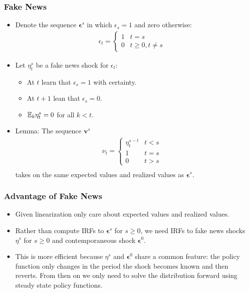 \documentclass[english,xcolor=svgnames]{beamer}
\begin{document}
\begin{frame}
    \frametitle{Fake News}
    \begin{itemize}
    	\item Denote the sequence $\bm{\epsilon}^s$ in which $\epsilon_s=1$ and zero otherwise:
        \begin{align*}
    		\epsilon_t = \begin{cases}
    			1 & t=s \\
    			0 & t\ge0, t\neq s
    		\end{cases}
    	\end{align*}
        \item Let $\eta_t^s$ be a fake news shock for $\epsilon_t$:
        \begin{itemize}
        	\item At $t$ learn that $\epsilon_{s}=1$ with certainty.
        	\item At $t+1$ lean that $\epsilon_{s}=0$.
        	\item $\mathbb{E}_{k}\eta_t^s=0$ for all $k<t$.
        \end{itemize}
        \item Lemma: The sequence $\bm{v}^s$
        \begin{align*}
    		\nu_t = \begin{cases}
    			\eta_t^{s-t} & t<s \\
    			1 & t= s \\
    			0 & t>s
    		\end{cases}\\
    	\end{align*}
        takes on the same expected values and realized values as $\bm{\epsilon}^s$.
	\end{itemize}
\end{frame}


\begin{frame}
    \frametitle{Advantage of Fake News}
    \begin{itemize}
    	\item Given linearization only care about expected values and realized values.
    	\item Rather than compute IRFs to $\bm{\epsilon}^s$ for $s\ge 0$, we need IRFs to fake news shocks $\eta^s$ for $s\ge 0$ and contemporaneous shock $\bm{\epsilon}^0$.
    	\item This is more efficient because $\eta^s$ and $\bm{\epsilon}^0$ share a common feature: the policy function only changes in the period the shock becomes known and then reverts. From then on we only need to solve the distribution forward using steady state policy functions.
	\end{itemize}
\end{frame}
\end{document}
